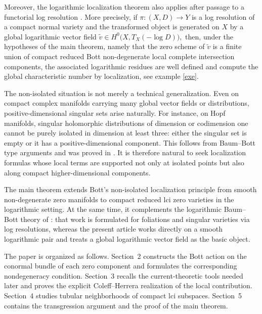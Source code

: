 \documentclass[12pt,a4paper,dvipsnames,x11names]{amsart}
\numberwithin{equation}{section}
\theoremstyle{plain}
\theoremstyle{definition}
\theoremstyle{remark}
\begin{document}
Moreover, the logarithmic localization theorem also applies after passage to a functorial log resolution \cite{CorreaLourencoMachado24}. More precisely, if
$
\pi:(X,D)\to Y
$
is a log resolution of a compact normal variety and the transformed object is generated on $X$ by a global logarithmic vector field
$
\widetilde v\in H^0\bigl(X,T_X(-\log D)\bigr),
$
then, under the hypotheses of the main theorem, namely that the zero scheme of $\widetilde v$ is a finite union of compact reduced Bott non-degenerate local complete intersection components, the associated logarithmic residues are well defined and compute the global characteristic number by localization, see example \ref{exe}.


The non-isolated situation is not merely a technical generalization. Even on compact complex manifolds carrying many global vector fields or distributions, positive-dimensional singular sets arise naturally. For instance, on Hopf manifolds, singular holomorphic distributions of dimension or codimension one cannot be purely isolated in dimension at least three: either the singular set is empty or it has a positive-dimensional component. This follows from Baum--Bott type arguments and was proved in \cite{CorreaFerreiraFernandezPerez16}. It is therefore natural to seek localization formulas whose local terms are supported not only at isolated points but also along compact higher-dimensional components.  






 

The main theorem extends Bott's non-isolated localization principle from smooth non-degenerate zero manifolds to compact reduced lci zero varieties in the logarithmic setting. At the same time, it complements the logarithmic Baum--Bott theory of \cite{CorreaLourencoMachado24}: that work is formulated for foliations and singular varieties via log resolutions, whereas the present article works directly on a smooth logarithmic pair and treats a global logarithmic vector field as the basic object.

The paper is organized as follows. Section~2 constructs the Bott action on the conormal bundle of each zero component and formulates the corresponding nondegeneracy condition. Section~3 recalls the current-theoretic tools needed later and proves the explicit Coleff--Herrera realization of the local contribution. Section~4 studies tubular neighborhoods of compact lci subspaces. Section~5 contains the transgression argument and the proof of the main theorem.
\end{document}
